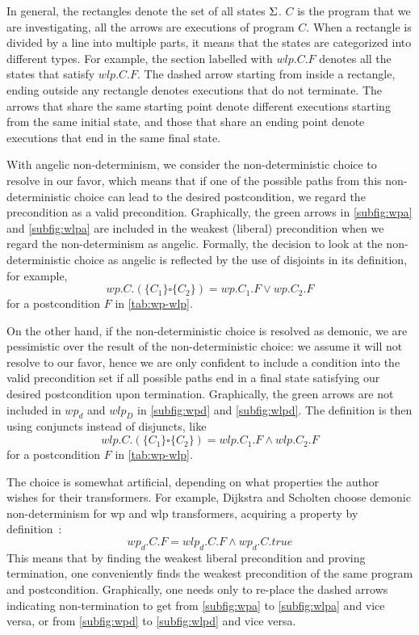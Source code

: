 In general, the rectangles denote the set of all states $\S$. 
$C$ is the program that we are investigating, all the arrows are executions of program $C$. 
When a rectangle is divided by a line into multiple parts, it means that the states are categorized into different types. 
For example, the section  labelled with $wlp.C.F$ denotes all the states that satisfy $wlp.C.F$. 
The dashed arrow starting from inside a rectangle, ending outside any rectangle denotes executions that do not terminate. 
The arrows that share the same starting point denote different executions starting from the same initial state, and those that share an ending point denote executions that end in the same final state. 

With angelic non-determinism, we consider the non-deterministic choice to resolve in our favor, which means that if one of the possible paths from this non-deterministic choice can lead to the desired postcondition, we regard the precondition as a valid precondition. 
Graphically, the green arrows in \autoref{subfig:wpa} and \autoref{subfig:wlpa} are included in the weakest (liberal) precondition when we regard the non-determinism as angelic. 
Formally, the decision to look at the non-deterministic choice as angelic is reflected by the use of disjoints in its definition, for example, 
$$wp.C.(\{C_1\}\square \{C_2\}) = wp.C_1.F\vee wp.C_2.F$$ for a postcondition $F$ in \autoref{tab:wp-wlp}.

On the other hand, if the non-deterministic choice is resolved as demonic, we are pessimistic over the result of the non-deterministic choice: we assume it will not resolve to our favor, hence we are only confident to include a condition into the valid precondition set if all possible paths end in a final state satisfying our desired postcondition upon termination. 
Graphically, the green arrows are not included in $wp_d$ and $wlp_D$ in \autoref{subfig:wpd} and \autoref{subfig:wlpd}. 
The definition is then using conjuncts instead of disjuncts, like 
$$wlp.C.(\{C_1\}\square \{C_2\}) = wlp.C_1.F\wedge wlp.C_2.F$$ for a postcondition $F$ in \autoref{tab:wp-wlp}.

The choice is somewhat artificial, depending on what properties the author wishes for their transformers.
For example, Dijkstra and Scholten choose demonic non-determinism for wp and wlp transformers, acquiring a property by definition~\cite{dijkstra90}: 
$$wp_d.C.F = wlp_d.C.F \wedge wp_d.C.true $$
This means that by finding the weakest liberal precondition and proving termination, one conveniently finds the weakest precondition of the same program and postcondition. 
Graphically, one needs only to re-place the dashed arrows indicating non-termination to get from \autoref{subfig:wpa} to \autoref{subfig:wlpa} and vice versa, or from  \autoref{subfig:wpd} to \autoref{subfig:wlpd} and vice versa. 

